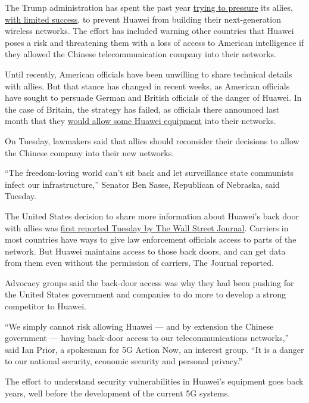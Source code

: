 The Trump administration has spent the past year
\href{https://www.nytimes.com/2019/01/26/us/politics/huawei-china-us-5g-technology.html}{trying
to pressure} its allies,
\href{https://www.nytimes.com/2019/03/17/us/politics/huawei-ban.html}{with
limited success}, to prevent Huawei from building their next-generation
wireless networks. The effort has included warning other countries that
Huawei poses a risk and threatening them with a loss of access to
American intelligence if they allowed the Chinese telecommunication
company into their networks.

Until recently, American officials have been unwilling to share
technical details with allies. But that stance has changed in recent
weeks, as American officials have sought to persuade German and British
officials of the danger of Huawei. In the case of Britain, the strategy
has failed, as officials there announced last month that they
\href{https://www.nytimes.com/2020/01/28/technology/britain-huawei-5G.html}{would
allow some Huawei equipment} into their networks.

On Tuesday, lawmakers said that allies should reconsider their decisions
to allow the Chinese company into their new networks.

``The freedom-loving world can't sit back and let surveillance state
communists infect our infrastructure,'' Senator Ben Sasse, Republican of
Nebraska, said Tuesday.

The United States decision to share more information about Huawei's back
door with allies was
\href{https://www.wsj.com/articles/u-s-officials-say-huawei-can-covertly-access-telecom-networks-11581452256}{first
reported Tuesday by The Wall Street Journal}. Carriers in most countries
have ways to give law enforcement officials access to parts of the
network. But Huawei maintains access to those back doors, and can get
data from them even without the permission of carriers, The Journal
reported.

Advocacy groups said the back-door access was why they had been pushing
for the United States government and companies to do more to develop a
strong competitor to Huawei.

``We simply cannot risk allowing Huawei --- and by extension the Chinese
government --- having back-door access to our telecommunications
networks,'' said Ian Prior, a spokesman for 5G Action Now, an interest
group. ``It is a danger to our national security, economic security and
personal privacy.''

The effort to understand security vulnerabilities in Huawei's equipment
goes back years, well before the development of the current 5G systems.

